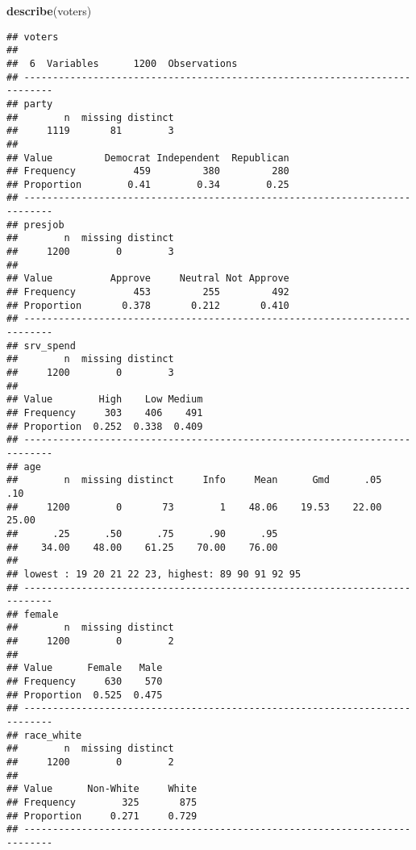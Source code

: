 \documentclass[]{article}
\newenvironment{Shaded}{\begin{snugshade}}{\end{snugshade}}
\newcommand{\KeywordTok}[1]{\textcolor[rgb]{0.13,0.29,0.53}{\textbf{{#1}}}}
\newcommand{\NormalTok}[1]{{#1}}
\begin{document}
\begin{Shaded}
\begin{Highlighting}[]
\KeywordTok{describe}\NormalTok{(voters)}
\end{Highlighting}
\end{Shaded}

\begin{verbatim}
## voters 
## 
##  6  Variables      1200  Observations
## ---------------------------------------------------------------------------
## party 
##        n  missing distinct 
##     1119       81        3 
##                                               
## Value         Democrat Independent  Republican
## Frequency          459         380         280
## Proportion        0.41        0.34        0.25
## ---------------------------------------------------------------------------
## presjob 
##        n  missing distinct 
##     1200        0        3 
##                                               
## Value          Approve     Neutral Not Approve
## Frequency          453         255         492
## Proportion       0.378       0.212       0.410
## ---------------------------------------------------------------------------
## srv_spend 
##        n  missing distinct 
##     1200        0        3 
##                                
## Value        High    Low Medium
## Frequency     303    406    491
## Proportion  0.252  0.338  0.409
## ---------------------------------------------------------------------------
## age 
##        n  missing distinct     Info     Mean      Gmd      .05      .10 
##     1200        0       73        1    48.06    19.53    22.00    25.00 
##      .25      .50      .75      .90      .95 
##    34.00    48.00    61.25    70.00    76.00 
## 
## lowest : 19 20 21 22 23, highest: 89 90 91 92 95
## ---------------------------------------------------------------------------
## female 
##        n  missing distinct 
##     1200        0        2 
##                         
## Value      Female   Male
## Frequency     630    570
## Proportion  0.525  0.475
## ---------------------------------------------------------------------------
## race_white 
##        n  missing distinct 
##     1200        0        2 
##                               
## Value      Non-White     White
## Frequency        325       875
## Proportion     0.271     0.729
## ---------------------------------------------------------------------------
\end{verbatim}
\end{document}
